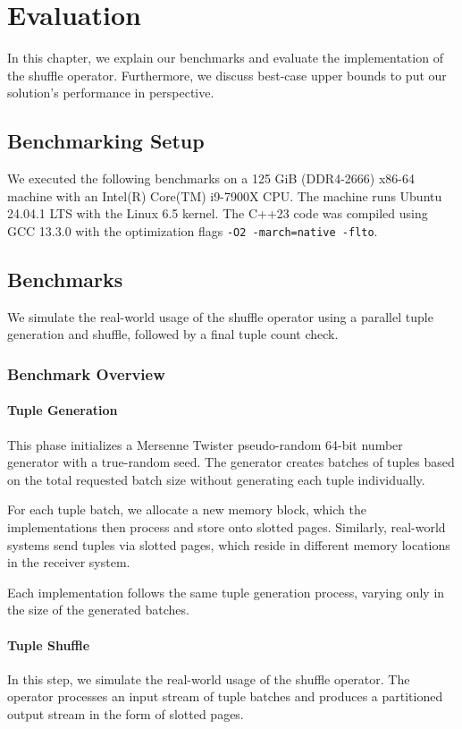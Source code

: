 
\chapter{Evaluation}\label{chapter:evaluation}\acresetall
In this chapter, we explain our benchmarks and evaluate the implementation of the shuffle operator.
Furthermore, we discuss best-case upper bounds to put our solution's performance in perspective.
\section{Benchmarking Setup}\label{section-benchmarking-setup}
We executed the following benchmarks on a 125 GiB (DDR4-2666) x86-64 machine with an Intel(R) Core(TM) i9-7900X CPU.
The machine runs Ubuntu 24.04.1 LTS with the Linux 6.5 kernel.
The C++23 code was compiled using GCC 13.3.0 with the optimization flags \texttt{-O2 -march=native -flto}.

\section{Benchmarks}
We simulate the real-world usage of the shuffle operator using a parallel tuple generation and shuffle, followed by a final tuple count check.

\subsection{Benchmark Overview}
\subsubsection{Tuple Generation}
This phase initializes a Mersenne Twister pseudo-random 64-bit number generator with a true-random seed.
The generator creates batches of tuples based on the total requested batch size without generating each tuple individually.

For each tuple batch, we allocate a new memory block, which the implementations then process and store onto slotted pages.
Similarly, real-world systems send tuples via slotted pages, which reside in different memory locations in the receiver system.

Each implementation follows the same tuple generation process, varying only in the size of the generated batches.
\subsubsection{Tuple Shuffle}
In this step, we simulate the real-world usage of the shuffle operator.
The operator processes an input stream of tuple batches and produces a partitioned output stream in the form of slotted pages.


